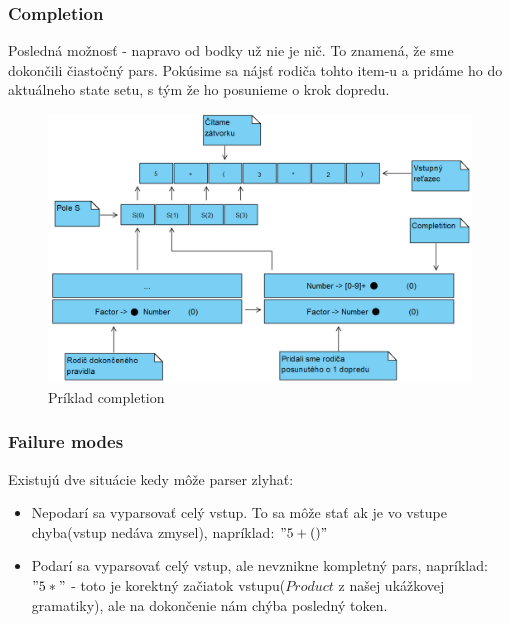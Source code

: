 \documentclass[12pt,a4paper]{report}
\theoremstyle{definition}
\theoremstyle{remark}
\begin{document}
\subsubsection*{Completion}
Posledná možnosť - napravo od bodky už nie je nič. To znamená, že sme dokončili čiastočný pars. Pokúsime sa nájsť rodiča tohto item-u a pridáme ho do aktuálneho state setu, s tým že ho posunieme o krok dopredu.

\begin{figure}[H]
\includegraphics[scale=0.7]{completition}
\caption{Príklad completion}
\end{figure}

\subsubsection*{Failure modes} 
Existujú dve situácie kedy môže parser zlyhať:
\begin{itemize}
\item Nepodarí sa vyparsovať celý vstup. To sa môže stať ak je vo vstupe chyba(vstup nedáva zmysel), napríklad: $"5 + ()"$
\item Podarí sa vyparsovať celý vstup, ale nevznikne kompletný pars, napríklad: $"5 *"$ - toto je korektný začiatok vstupu($Product$ z našej ukážkovej gramatiky), ale na dokončenie nám chýba posledný token.
\end{itemize}
\end{document}
